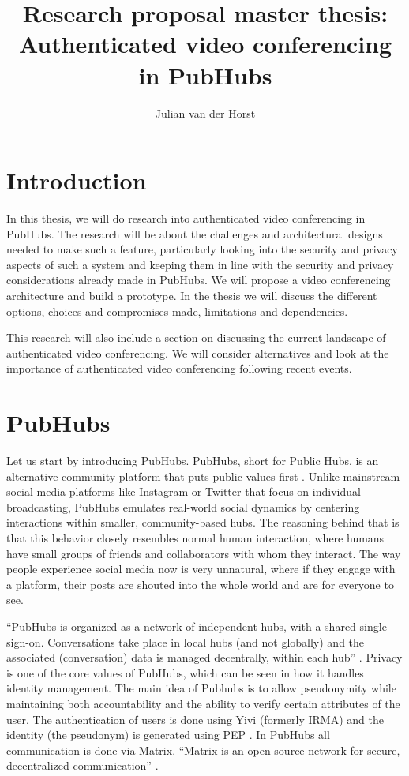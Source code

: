 \documentclass[11pt,a4paper]{article}
\title{Research proposal master thesis: \\ Authenticated video conferencing in PubHubs}
\author{Julian van der Horst}
\begin{document}
    \maketitle


    \section{Introduction}
    In this thesis, we will do research into authenticated video conferencing in PubHubs. The research will be about the
    challenges and architectural designs needed to make such a feature, particularly looking into the security and
    privacy aspects of such a system and keeping them in line with the security and privacy considerations already made
    in PubHubs. We will propose a video conferencing architecture and build a prototype. In the thesis we will discuss
    the different options, choices and compromises made, limitations and dependencies.

    This research will also include a section on discussing the current landscape of authenticated video conferencing.
    We will consider alternatives and look at the importance of authenticated video conferencing following recent
    events.


    \section{PubHubs}
    Let us start by introducing PubHubs. PubHubs, short for Public Hubs, is an alternative community platform that puts
    public values first \cite{PH}
    . Unlike mainstream social media platforms like Instagram or Twitter that focus on individual broadcasting, PubHubs
    emulates real-world social dynamics by centering interactions within smaller, community-based hubs. The reasoning
    behind that is that this behavior closely resembles normal human interaction, where humans have small groups of
    friends and collaborators with whom they interact. The way people experience social media now is very unnatural,
    where if they engage with a platform, their posts are shouted into the whole world and are for everyone to see.

    “PubHubs is organized as a network of independent hubs, with a shared single-sign-on. Conversations take place in
    local hubs (and not globally) and the associated (conversation) data is managed decentrally, within each hub”
    \cite{PH}
    . Privacy is one of the core values of PubHubs, which can be seen in how it handles identity management. The main
    idea of Pubhubs is to allow pseudonymity while maintaining both accountability and the ability to verify certain
    attributes of the user. The authentication of users is done using Yivi (formerly IRMA)\cite{YIVI}
    and the identity (the pseudonym) is generated using PEP \cite{PEP}
    . In PubHubs all communication is done via Matrix. “Matrix is an open-source network for secure, decentralized
    communication” \cite{MATRIX}.
\end{document}
